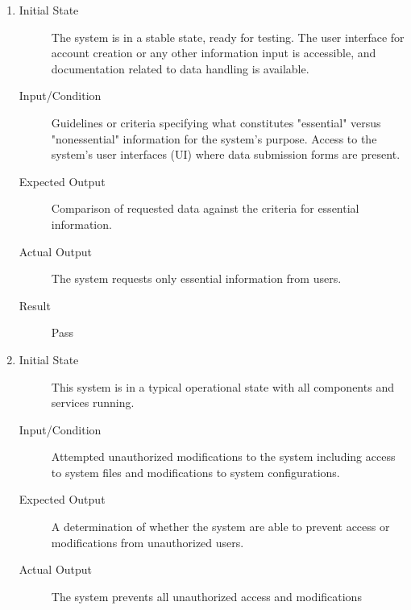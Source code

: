 \documentclass[12pt, titlepage]{article}
\begin{document}
\begin{enumerate}[NFR-T1]
  \item \label{NFRT22}
    \begin{description}
    \item[Initial State] The system is in a stable state, ready for testing. The
      user interface for account creation or any other information input is
      accessible, and documentation related to data handling is available.
    \item[Input/Condition] Guidelines or criteria specifying what constitutes
      "essential" versus "nonessential" information for the system’s purpose.
      Access to the system's user interfaces (UI) where data submission forms are
      present.
    \item[Expected Output] Comparison of requested data against the criteria for
      essential information.
    \item[Actual Output] The system requests only essential information from users.
    \item[Result] Pass 
    \end{description}
  \item \label{NFRT23}
    \begin{description}
    \item[Initial State] This system is in a typical operational state with all
      components and services running.
    \item[Input/Condition] Attempted unauthorized modifications to the system
      including access to system files and modifications to system configurations.
    \item[Expected Output] A determination of whether the system are able to prevent
      access or modifications from unauthorized users.
    \item[Actual Output] The system prevents all unauthorized access and modifications 

\end{description}
\end{enumerate}
\end{document}
